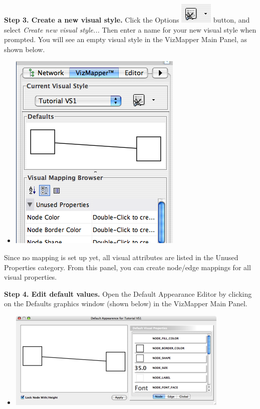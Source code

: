  \textbf{Step 3. Create a new visual style.}
 Click the Options \includegraphics[width=.6\textwidth]{images/VizMapOptionIcon.png}  button, and select \emph{Create new visual style...}
 Then enter a name for your new visual style when prompted. You will see an empty visual style in the VizMapper Main Panel, as shown below. 
\begin{itemize}
\item 

 \includegraphics[width=.6\textwidth]{images/EmptyVisualStyle.png} 


\end{itemize}


 Since no mapping is set up yet, all visual attributes are listed in the Unused Properties category. From this panel, you can create node/edge mappings for all visual properties. 


 \textbf{Step 4. Edit default values.}
 Open the Default Appearance Editor by clicking on the Defaults graphics window (shown below) in the VizMapper Main Panel. 
\begin{itemize}
\item 

 \includegraphics[width=.6\textwidth]{images/InitialDefaultEditor.png} 


\end{itemize}


